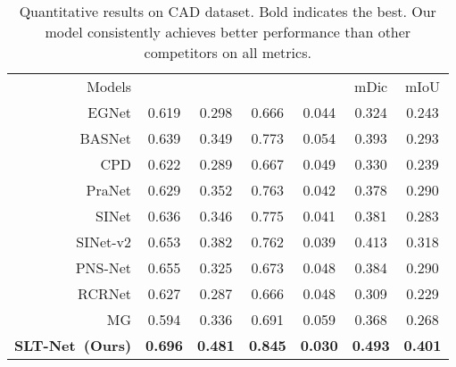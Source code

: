 \documentclass[10pt,twocolumn,letterpaper]{article}
\def\Ourmodel{SLT-Net}
\begin{document}
\begin{table}[t!]
  \footnotesize
  \centering
  \caption{Quantitative results on CAD dataset. Bold indicates the best. 
  Our model consistently achieves better performance than other competitors on all metrics.
  }
  \label{tab:results_CAD}
  \vspace{-5pt}
  \tabcolsep=0.19cm
  \renewcommand{\arraystretch}{0.5}
\begin{tabular}{r|cccccc} 
  \toprule
  Models &  &  & & & mDic & mIoU\\
  \cmidrule(lr){1-7}
  {EGNet} \cite{zhao2019EGNet}   & 0.619 & 0.298 & 0.666 & 0.044 & 0.324 & 0.243   \\
  {BASNet} \cite{Qin_2019_CVPR}  & 0.639 & 0.349 & 0.773 & 0.054 & 0.393 & 0.293    \\
  {CPD} \cite{Wu_2019_CVPR}      & 0.622 & 0.289 & 0.667 & 0.049 & 0.330 & 0.239 \\
  {PraNet} \cite{fan2020pra}     & 0.629 & 0.352 & 0.763 & 0.042 & 0.378 & 0.290 \\
  {SINet} \cite{fan2020Camouflage}  &  0.636 & 0.346 & 0.775 & 0.041 & 0.381 & 0.283   \\
  {SINet-v2} \cite{fan2021concealed}  &  0.653 & 0.382 & 0.762 & 0.039 & 0.413 & 0.318 \\ 
\cmidrule(lr){1-7}
  {PNS-Net} \cite{ji2021progressively} & 0.655 & 0.325 & 0.673 & 0.048 &  0.384 &  0.290  \\
  {RCRNet} \cite{yan2019semi} & 0.627 & 0.287 & 0.666 & 0.048 & 0.309 & 0.229  \\
  {MG} \cite{yang2021selfsupervised} & 0.594 & 0.336 & 0.691 & 0.059 & 0.368 & 0.268 \\
  
\textbf{\Ourmodel~(Ours)} & \textbf{0.696} & \textbf{0.481} & \textbf{0.845} & \textbf{0.030} & \textbf{0.493} & \textbf{0.401} \\
  \bottomrule
  \end{tabular}
\end{table}
\end{document}
